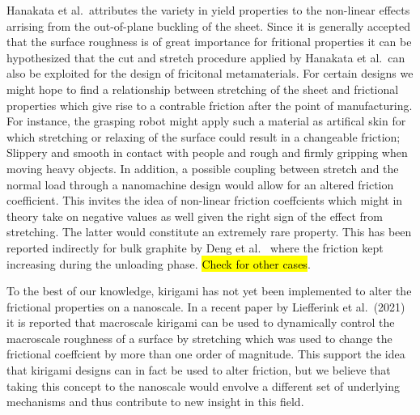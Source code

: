 Hanakata et al.\ attributes the variety in yield properties to the non-linear
effects arrising from the out-of-plane buckling of the sheet. Since it is
generally accepted that the surface roughness is of great importance for
fritional properties it can be hypothesized that the cut and stretch procedure
applied by Hanakata et al.\ can also be exploited for the design of fricitonal
metamaterials. For certain designs we might hope to find a relationship between
stretching of the sheet and frictional properties which give rise to a
contrable friction after the point of
manufacturing. For instance, the grasping robot might apply such a material as artifical skin for which stretching or relaxing of the surface could result in a changeable friction; Slippery and smooth in contact with people and rough and firmly
gripping when moving heavy objects. In addition, a possible coupling between
stretch and the normal load through a nanomachine design would allow for an
altered friction coefficient. This invites the idea of non-linear friction
coeffcients which might in theory take on negative values as well given the
right sign of the effect from stretching. The latter would constitute an
extremely rare property. This has been reported indirectly for bulk graphite by
Deng et al.\ \cite{deng_adhesion-dependent_2012} where the friction kept
increasing during the unloading phase. \hl{Check for other cases}.

To the best of our knowledge, kirigami has not yet been implemented to alter the
frictional properties on a nanoscale. In a recent paper by Liefferink
et al.\ \cite{LIEFFERINK2021101475}(2021) it is reported that macroscale
kirigami can be used to dynamically control the macroscale roughness of a
surface by stretching which was used to change the frictional coeffcient by
more than one order of magnitude. This support the idea that kirigami designs
can in fact be used to alter friction, but we believe that taking this concept
to the nanoscale would envolve a different set of underlying mechanisms and thus
contribute to new insight in this field.













